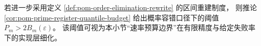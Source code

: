 \begin{remark}\label{rem:conclusion-rate-cdim-prime-register-interface}
若进一步采用定义 \ref{def:pom-order-elimination-rewrite} 的区间重建制度，
则推论 \ref{cor:pom-prime-register-quantile-budget} 给出概率容错口径下的阈值
\(
P_m>2B_m(\varepsilon)
\)。
该阈值可视为本小节“速率预算边界”在有限精度与给定失败率下的实现层细化。
\end{remark}
